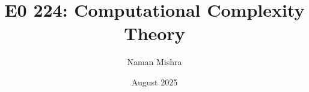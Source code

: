 \documentclass[12pt]{report}
\title{E0 224: Computational Complexity Theory}
\author{Naman Mishra}
\date{August 2025}
\begin{document}
\maketitle
\tableofcontents
\listoflecture
    
\end{document}
